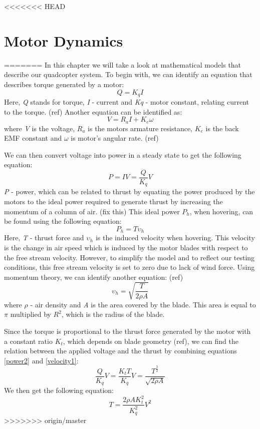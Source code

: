 <<<<<<< HEAD
\section{Motor Dynamics}
=======
In this chapter we will take a look at mathematical models that describe our quadcopter system.
To begin with, we can identify an equation that describes torque generated by a motor:
\begin{equation}
\label{torque1}
	Q = K_qI
\end{equation}
Here, \textit{Q} stands for torque, \textit{I} - current and \textit{Kq} - motor constant, relating current to the torque. (ref)
Another equation can be identified as:
\begin{equation}
\label{voltage1}
	V = R_aI + K_e\omega
\end{equation}
where \textit{V} is the voltage, \textit{$R_a$} is the motors armature resistance, \textit{$K_e$} is the back EMF constant and \textit{$\omega$} is motor's angular rate. (ref)

We can then convert voltage into power in a steady state to get the following equation:
\begin{equation}
\label{power1}
	P = IV = \frac{Q}{K_q}V
\end{equation}
\textit{P} - power, which can be related to thrust by equating the power produced by the motors to the ideal power required to generate thrust by increasing the momentum of a column of air. (fix this) This ideal power \textit{$P_h$}, when hovering, can be found using the following equation:
\begin{equation}
\label{power2}
	P_h = T\upsilon_h
\end{equation}
Here, \textit{T} - thrust force and \textit{$\upsilon_h$} is the induced velocity when hovering. This velocity is the change in air speed which is induced by the motor blades with respect to the free stream velocity. However, to simplify the model and to reflect our testing conditions, this free stream velocity is set to zero due to lack of wind force.
Using momentum theory, we can identify another equation: (ref)
\begin{equation}
\label{velocity1}
	\upsilon_h = \sqrt{\frac{T}{2\rho A}}
\end{equation}
where \textit{$\rho$} - air density and \textit{A} is the area covered by the blade. This area is equal to $\pi$ multiplied by $R^2$, which is the radius of the blade.

Since the torque is proportional to the thrust force generated by the motor with a constant ratio \textit{$K_t$}, which depends on blade geometry (ref), we can find the relation between the applied voltage and the thrust by combining equations \ref{power2} and \ref{velocity1}:
\begin{equation}
\label{voltage2}
	\frac{Q}{K_q}V = \frac{K_tT}{K_q}V = \frac{T^\frac{3}{2}}{\sqrt{2\rho A}}
\end{equation}
We then get the following equation:
\begin{equation}
\label{thrust1}
	T = \frac{2\rho AK_t^2}{K_q^2}V^2
\end{equation}
>>>>>>> origin/master
